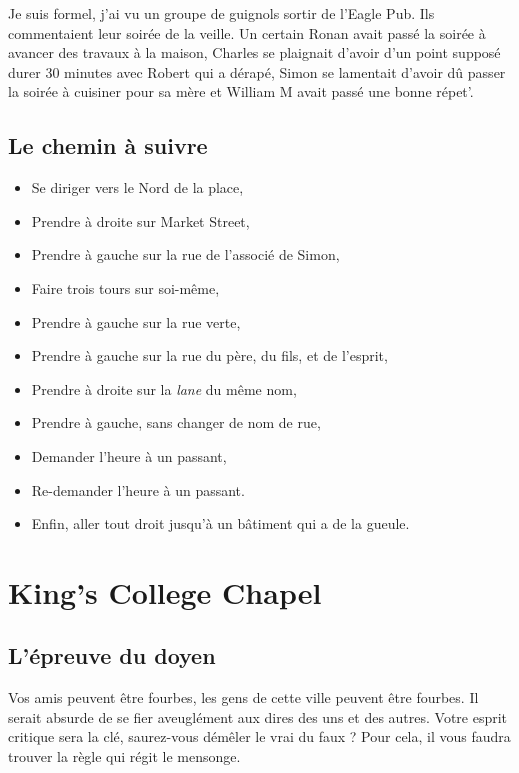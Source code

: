 \documentclass[12pt]{article}
\begin{document}
Je suis formel, j'ai vu un groupe de guignols sortir de l'Eagle Pub. Ils commentaient leur soirée de la veille. Un certain Ronan avait passé la soirée à avancer des travaux à la maison, Charles se plaignait d'avoir d'un point supposé durer 30 minutes avec Robert qui a dérapé, Simon se lamentait d'avoir dû passer la soirée à cuisiner pour sa mère et William M avait passé une bonne répet'.

\subsection{Le chemin à suivre}

\begin{itemize}
  \item Se diriger vers le Nord de la place,
  \item Prendre à droite sur Market Street,
  \item Prendre à gauche sur la rue de l'associé de Simon,
  \item Faire trois tours sur soi-même,
  \item Prendre à gauche sur la rue verte,
  \item Prendre à gauche sur la rue du père, du fils, et de l'esprit,
  \item Prendre à droite sur la {\it lane} du même nom,
  \item Prendre à gauche, sans changer de nom de rue,
  \item Demander l'heure à un passant,
  \item Re-demander l'heure à un passant.
  \item Enfin, aller tout droit jusqu'à un bâtiment qui a de la gueule.
\end{itemize}  

\section{King's College Chapel}


\subsection{L'épreuve du doyen}

Vos amis peuvent être fourbes, les gens de cette ville peuvent être fourbes. 
Il serait absurde de se fier aveuglément aux dires des uns et des autres. 
Votre esprit critique sera la clé, saurez-vous démêler le vrai du faux ? 
Pour cela, il vous faudra trouver la règle qui régit le mensonge.
\end{document}
